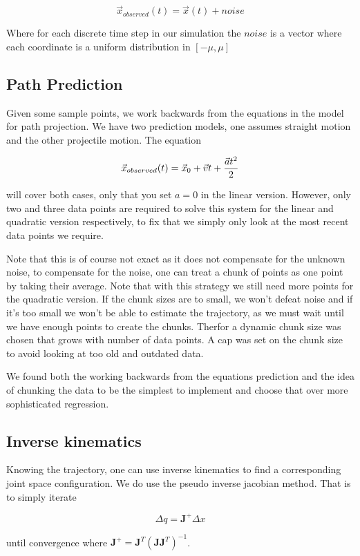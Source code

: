 \documentclass[letterpaper, 10 pt, conference]{ieeeconf}  %
\begin{document}
\[
  \vec{x}_{observed}(t) = \vec{x}(t) + noise
\]

Where for each discrete time step in our simulation the $noise$ is a vector
where each coordinate is a uniform distribution in $[-\mu, \mu]$

\subsection{Path Prediction}

Given some sample points, we work backwards from the equations in the
model for path projection.  We have two prediction models, one assumes
straight motion and the other projectile motion.  The equation

\[
  \vec{x}_{observed}(t) = \vec{x}_0 + \vec{v}t + {\vec{a}t^2 \over 2}
\]

will cover both cases, only that you set $a=0$ in the linear version.
However, only two and three data points are required to solve this
system for the linear and quadratic version respectively, to fix that we
simply only look at the most recent data points we require.

Note that this is of course not exact as  it does not compensate for the
unknown noise, to compensate for the noise, one can treat a chunk of
points  as one point by taking their average. Note that with this
strategy we still need more points for the quadratic version. If the
chunk sizes are to small, we won't defeat noise and if it's too small we
won't be able to estimate the trajectory, as we must wait until we have
enough points to create the chunks. Therfor a dynamic chunk size was
chosen that grows with number of data points. A cap was set on the chunk
size to avoid looking at too old and outdated data.

We found both the working backwards from the equations prediction and
the idea of chunking the data to be the simplest to implement and choose
that over more sophisticated regression.

\subsection{Inverse kinematics}

Knowing the trajectory, one can use inverse kinematics to find a corresponding
joint space configuration. We do use the pseudo inverse jacobian method.
That is to simply iterate

\[
  \Delta q = \mathbf{J}^{+} \Delta x
\]

until convergence where $\mathbf{J}^{+} =
\mathbf{J}^T(\mathbf{J}\mathbf{J}^T)^{-1}$.
\end{document}
